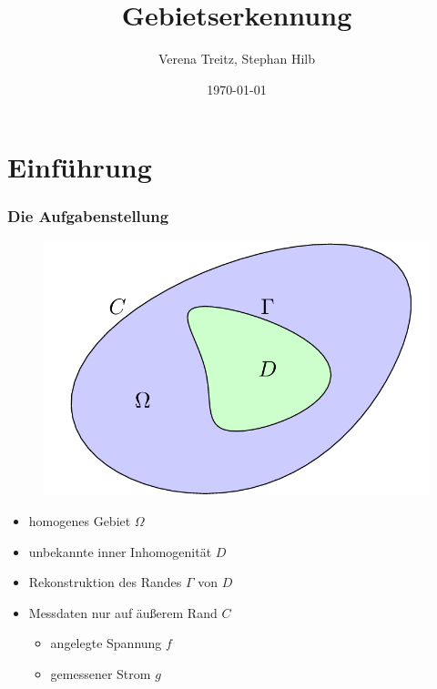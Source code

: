 \documentclass{beamer}
\title{Gebietserkennung}
\author{Verena Treitz, Stephan Hilb}
\date{\today}
\begin{document}
\begin{frame}
	\titlepage
\end{frame}

\section{Einführung}


\begin{frame}
	\frametitle{Die Aufgabenstellung}
	\begin{minipage}{0.60\textwidth}
		\begin{figure}
			\centering
			\includegraphics[width=\textwidth]{tikz/basic.png}
		\end{figure}
	\end{minipage}
	\hfill
	\begin{minipage}{0.38\textwidth}
		\begin{itemize}
			\item \pause
				homogenes Gebiet $\Omega$
			\item
				unbekannte inner Inhomogenität $D$
			\item
				Rekonstruktion des Randes $\Gamma$ von $D$
			\item \pause
				Messdaten nur auf äußerem Rand $C$
				\begin{itemize}
					\item
						angelegte Spannung $f$
					\item
						gemessener Strom $g$
				\end{itemize}
		\end{itemize}
	\end{minipage}
\end{frame}
\end{document}
